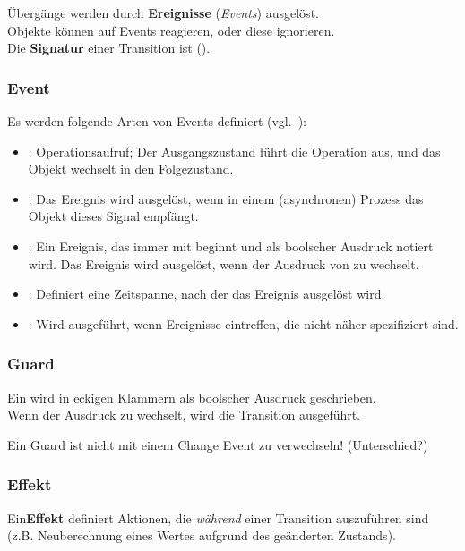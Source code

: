 \noindent
Übergänge werden durch \textbf{Ereignisse} (\textit{Events}) ausgelöst.\\
Objekte können auf Events reagieren, oder diese ignorieren.\\

\noindent
Die \textbf{Signatur} einer Transition ist  (\cite[321]{OMG17}).

\subsubsection*{Event}
Es werden folgende Arten von Events definiert (vgl.~\cite[69]{Buh09}):

\begin{itemize}
    \item {}: Operationsaufruf; Der Ausgangszustand führt die Operation aus, und das Objekt wechselt in den Folgezustand.
    \item {}: Das Ereignis wird ausgelöst, wenn in einem (asynchronen) Prozess das Objekt dieses Signal empfängt.
    \item {}: Ein Ereignis, das immer mit  beginnt und als boolscher Ausdruck notiert wird. Das Ereignis wird ausgelöst, wenn der Ausdruck von  zu  wechselt.
    \item {}: Definiert eine Zeitspanne, nach der das Ereignis ausgelöst wird.
    \item {}: Wird ausgeführt, wenn Ereignisse eintreffen, die nicht näher spezifiziert sind.
\end{itemize}

\subsubsection*{Guard}
Ein  wird in eckigen Klammern als boolscher Ausdruck geschrieben.\\
Wenn der Ausdruck zu  wechselt, wird die Transition ausgeführt.

\begin{tcolorbox}[colback=yellow!20]
    Ein Guard ist nicht mit einem Change Event zu verwechseln! (Unterschied?)
\end{tcolorbox}

\subsubsection*{Effekt}
Ein\textbf{Effekt} definiert Aktionen, die \textit{während} einer Transition auszuführen sind (z.B. Neuberechnung eines Wertes aufgrund des geänderten Zustands).\\

